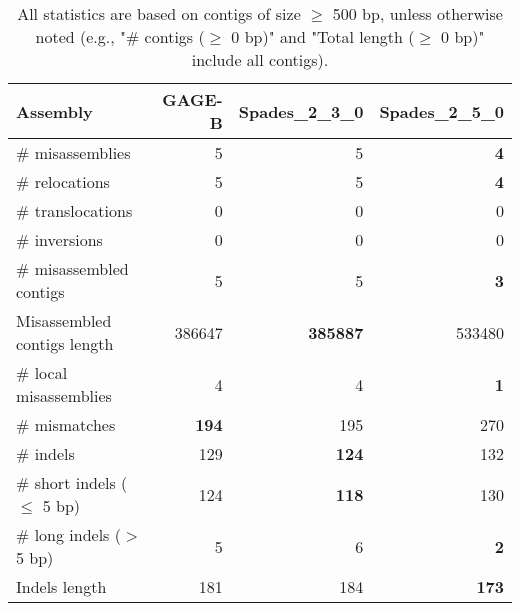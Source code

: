 \documentclass[12pt,a4paper]{article}
\begin{document}
\begin{table}[ht]
\begin{center}
\caption{All statistics are based on contigs of size $\geq$ 500 bp, unless otherwise noted (e.g., "\# contigs ($\geq$ 0 bp)" and "Total length ($\geq$ 0 bp)" include all contigs).}
\begin{tabular}{|l*{3}{|r}|}
\hline
Assembly & GAGE-B & Spades\_2\_3\_0 & Spades\_2\_5\_0 \\ \hline
\# misassemblies & 5 & 5 & {\bf 4} \\ \hline
\hspace{5mm}\# relocations & 5 & 5 & {\bf 4} \\ \hline
\hspace{5mm}\# translocations & 0 & 0 & 0 \\ \hline
\hspace{5mm}\# inversions & 0 & 0 & 0 \\ \hline
\# misassembled contigs & 5 & 5 & {\bf 3} \\ \hline
Misassembled contigs length & 386647 & {\bf 385887} & 533480 \\ \hline
\# local misassemblies & 4 & 4 & {\bf 1} \\ \hline
\# mismatches & {\bf 194} & 195 & 270 \\ \hline
\# indels & 129 & {\bf 124} & 132 \\ \hline
\hspace{5mm}\# short indels ($\leq$ 5 bp) & 124 & {\bf 118} & 130 \\ \hline
\hspace{5mm}\# long indels ($>$ 5 bp) & 5 & 6 & {\bf 2} \\ \hline
Indels length & 181 & 184 & {\bf 173} \\ \hline
\end{tabular}
\end{center}
\end{table}
\end{document}
